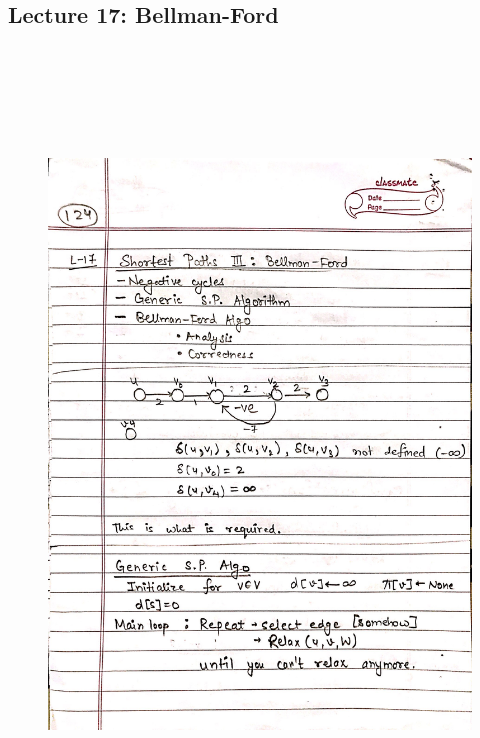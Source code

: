 \newpage
{\color{black} \subsection*{Lecture 17: Bellman-Ford}}
\begin{figure}[H]
    \centering
    \includegraphics[width=16cm, height=21cm]{"./MIT-6.006/MIT-6006-124"}
\end{figure}


